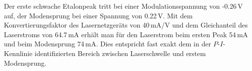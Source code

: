 Der erste schwache Etalonpeak tritt bei einer Modulationsspannung von -0.26\,V auf, der Modensprung
bei einer Spannung von 0.22\,V.
Mit dem Konvertierungsfaktor des Lasernetzgeräts von 40\,mA/V und dem Gleichanteil des Laserstroms von 64.7\,mA
erhält man für den Laserstrom beim ersten Peak 54\,mA und beim Modensprung 74\,mA.
Dies entspricht fast exakt dem in der $P$-$I$-Kennlinie identifizierten Bereich
zwischen Laserschwelle und erstem Modensprung.



